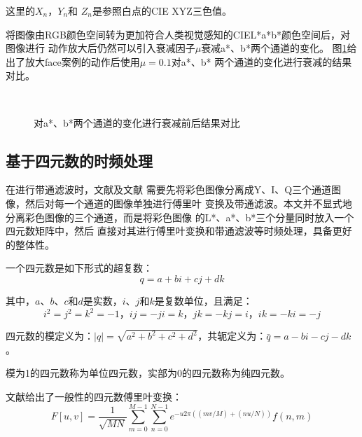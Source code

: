 这里的$X_n$，$Y_n$和 $Z_n$是参照白点的CIE XYZ三色值。

将图像由RGB颜色空间转为更加符合人类视觉感知的CIEL*a*b*颜色空间后，对图像进行
动作放大后仍然可以引入衰减因子$\mu$衰减a*、b*两个通道的变化。
图\ref{fig:attenuation}给出了放大face案例的动作后使用$\mu = 0.1$对a*、b*
两个通道的变化进行衰减的结果对比。

\begin{figure}[htbp]
  \centering
  \\
  \caption{对a*、b*两个通道的变化进行衰减前后结果对比}
  \label{fig:attenuation}
\end{figure}

\subsection{基于四元数的时频处理}
\label{sec:real-quaternion-fourier}

在进行带通滤波时，文献\cite{wu2012eulerian}及文献\cite{Wadhwa2013PhaseBased}
需要先将彩色图像分离成Y、I、Q三个通道图像，然后对每一个通道的图像单独进行傅里叶
变换及带通滤波。本文并不显式地分离彩色图像的三个通道，而是将彩色图像
的L*、a*、b*三个分量同时放入一个四元数矩阵中，然后
直接对其进行傅里叶变换和带通滤波等时频处理，具备更好的整体性。

  一个四元数是如下形式的超复数：
  \begin{equation}
    \label{eq:real-quaternion-fourier}
    q=a+bi+cj+dk
  \end{equation}
  
  其中，$a$、$b$、$c$和$d$是实数，$i$、$j$和$k$是复数单位，且满足：
  \begin{equation}
    \label{eq:ijk}
    i^2=j^2=k^2=-1\mbox{，}ij=-ji=k\mbox{，}jk=-kj=i\mbox{，}ik=-ki=-j
  \end{equation}

四元数的模定义为：$\left|q\right|=\sqrt{a^2+b^2+c^2+d^2}$，共轭定义为：$\bar{q}=a-bi-cj-dk$。

模为1的四元数称为单位四元数，实部为0的四元数称为纯四元数。

文献\cite{sangwine2000discrete}给出了一般性的四元数傅里叶变换：
\begin{equation}
  \label{eq:quaternion-fourier}
  F[u,v]=\frac{1}{\sqrt{MN}}\sum_{m=0}^{M-1}\sum_{n=0}^{N-1}e^{-u2\pi((mv/M)+(nu/N))}f(n,m)
\end{equation}

